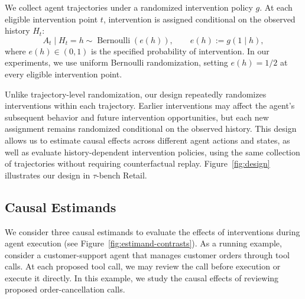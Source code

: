 We collect agent trajectories under a randomized intervention policy $g$.
At each eligible intervention point $t$, intervention is assigned conditional on the observed history $H_t$:
\begin{equation}
    A_t\mid H_t=h
    \sim \operatorname{Bernoulli}(e(h)),
    \qquad
    e(h):=g(1\mid h),
    \label{eq:randomization}
\end{equation}
where $e(h)\in(0,1)$ is the specified probability of intervention.
In our experiments, we use uniform Bernoulli randomization, setting $e(h)=1/2$ at every eligible intervention point.

Unlike trajectory-level randomization, our design repeatedly randomizes interventions within each trajectory.
Earlier interventions may affect the agent's subsequent behavior and future intervention opportunities, but each new assignment remains randomized conditional on the observed history.
This design allows us to estimate causal effects across different agent actions and states, as well as evaluate history-dependent intervention policies, using the same collection of trajectories without requiring counterfactual replay. Figure~\ref{fig:design} illustrates our design in $\tau$-bench Retail.


\subsection{Causal Estimands}
\label{sec:estimands}




We consider three causal estimands to evaluate the effects of interventions during agent execution (see Figure~\ref{fig:estimand-contrasts}).
As a running example, consider a customer-support agent that manages customer orders through tool calls.
At each proposed tool call, we may review the call before execution or execute it directly.
In this example, we study the causal effects of reviewing proposed order-cancellation calls.

